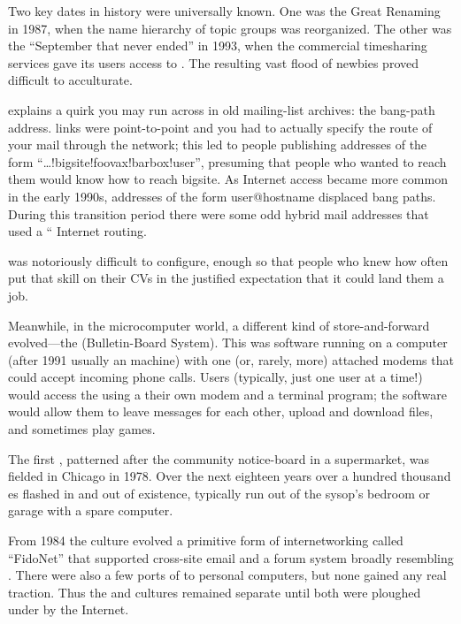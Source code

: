 Two key dates in  history were universally known. One was the Great
Renaming in 1987, when the name hierarchy of  topic groups was
reorganized. The other was the ``September that never ended'' in 1993, when the
 commercial timesharing services gave its users access to . The
resulting vast flood of newbies proved difficult to acculturate.

 explains a quirk you may run across in old mailing-list archives: the
bang-path address.  links were point-to-point and you had to actually
specify the route of your mail through the  network; this led to people
publishing addresses of the form ``…!bigsite!foovax!barbox!user'', presuming that
people who wanted to reach them would know how to reach bigsite. As Internet
access became more common in the early 1990s, addresses of the form
user@hostname displaced bang paths. During this transition period there were
some odd hybrid mail addresses that used a ``%
Internet routing.

 was notoriously difficult to configure, enough so that people who knew how
often put that skill on their CVs in the justified expectation that it could
land them a job.

Meanwhile, in the microcomputer world, a different kind of store-and-forward
evolved---the  (Bulletin-Board System). This was software running on a
computer (after 1991 usually an  machine) with one (or, rarely, more)
attached modems that could accept incoming phone calls. Users (typically, just
one user at a time!) would access the  using a their own modem and a
terminal program; the  software would allow them to leave messages for each
other, upload and download files, and sometimes play games.

The first , patterned after the community notice-board in a supermarket, was
fielded in Chicago in 1978. Over the next eighteen years over a hundred
thousand es flashed in and out of existence, typically run out of the
sysop's bedroom or garage with a spare computer.

From 1984 the  culture evolved a primitive form of internetworking called
``FidoNet'' that supported cross-site email and a forum system broadly resembling
. There were also a few ports of  to  personal computers, but none
gained any real traction. Thus the  and  cultures remained separate
until both were ploughed under by the Internet.

